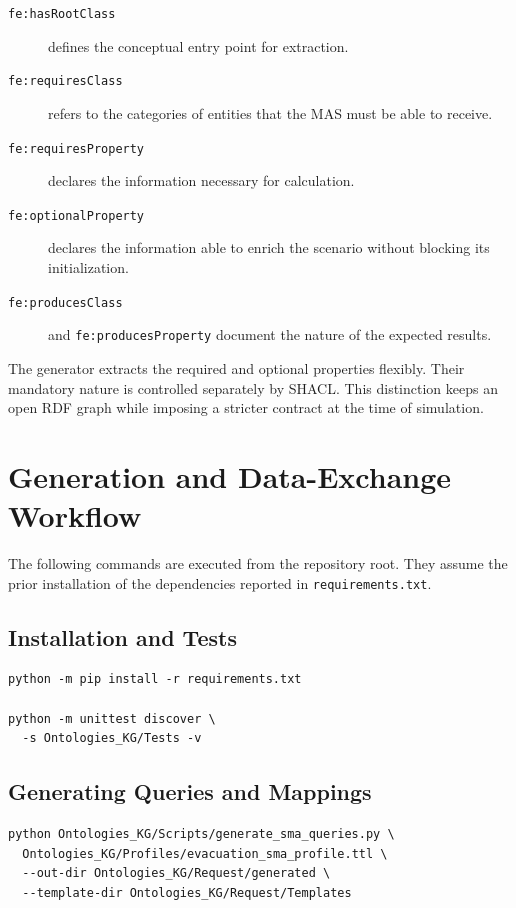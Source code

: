 \documentclass{article}
\begin{document}
\begin{description}
\item[\texttt{fe:hasRootClass}] defines the conceptual entry point for extraction.
\item[\texttt{fe:requiresClass}] refers to the categories of entities that the MAS must be able to receive.
\item[\texttt{fe:requiresProperty}] declares the information necessary for calculation.
\item[\texttt{fe:optionalProperty}] declares the information able to enrich the scenario without blocking its initialization.
\item[\texttt{fe:producesClass}] and \texttt{fe:producesProperty} document the nature of the expected results.
\end{description}

The generator extracts the required and optional properties flexibly. Their mandatory nature is controlled separately by SHACL. This distinction keeps an open RDF graph while imposing a stricter contract at the time of simulation.

\clearpage
\section{Generation and Data-Exchange Workflow}

The following commands are executed from the repository root. They assume the prior installation of the dependencies reported in \texttt{requirements.txt}.

\subsection{Installation and Tests}

\begin{lstlisting}
python -m pip install -r requirements.txt

python -m unittest discover \
  -s Ontologies_KG/Tests -v
\end{lstlisting}

\subsection{Generating Queries and Mappings}

\begin{lstlisting}
python Ontologies_KG/Scripts/generate_sma_queries.py \
  Ontologies_KG/Profiles/evacuation_sma_profile.ttl \
  --out-dir Ontologies_KG/Request/generated \
  --template-dir Ontologies_KG/Request/Templates
\end{lstlisting}
\end{document}
